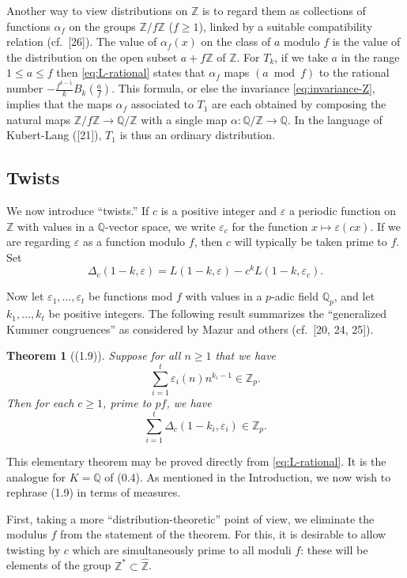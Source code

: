 \documentclass[12pt,a4paper]{article}
\theoremstyle{plain}
\newtheorem{theorem}{Theorem}[section]
\theoremstyle{definition}
\newcommand{\Z}{\mathbb{Z}}
\newcommand{\Q}{\mathbb{Q}}
\begin{document}
Another way to view distributions on $\Z$ is to regard them as collections of functions $\alpha_f$ on the groups $\Z/f\Z$ ($f\ge1$), linked by a suitable compatibility relation (cf.~[26]). The value of $\alpha_f(x)$ on the class of $a$ modulo $f$ is the value of the distribution on the open subset $a+f\Z$ of $\Z$. For $T_k$, if we take $a$ in the range $1\le a\le f$ then \eqref{eq:L-rational} states that $\alpha_f$ maps $(a\bmod f)$ to the rational number $-\frac{f^{k-1}}{k}B_k(\frac{a}{f})$. This formula, or else the invariance \eqref{eq:invariance-Z}, implies that the maps $\alpha_f$ associated to $T_1$ are each obtained by composing the natural maps $\Z/f\Z\to\Q/\Z$ with a single map $\alpha:\Q/\Z\to\Q$. In the language of Kubert-Lang ([21]), $T_1$ is thus an ordinary distribution.

\subsection*{Twists}

We now introduce ``twists.'' If $c$ is a positive integer and $\varepsilon$ a periodic function on $\Z$ with values in a $\Q$-vector space, we write $\varepsilon_c$ for the function $x\mapsto\varepsilon(cx)$. If we are regarding $\varepsilon$ as a function modulo $f$, then $c$ will typically be taken prime to $f$. Set
\begin{equation}\label{eq:twist}
\Delta_c(1-k,\varepsilon)=L(1-k,\varepsilon)-c^kL(1-k,\varepsilon_c).
\end{equation}

Now let $\varepsilon_1,\dots,\varepsilon_t$ be functions mod $f$ with values in a $p$-adic field $\Q_p$, and let $k_1,\dots,k_t$ be positive integers. The following result summarizes the ``generalized Kummer congruences'' as considered by Mazur and others (cf.~[20, 24, 25]).

\begin{theorem}[(1.9)]\label{thm:kummer}
Suppose for all $n\ge1$ that we have
\[
\sum_{i=1}^{t}\varepsilon_i(n)n^{k_i-1}\in\Z_p.
\]
Then for each $c\ge1$, prime to $pf$, we have
\[
\sum_{i=1}^{t}\Delta_c(1-k_i,\varepsilon_i)\in\Z_p.
\]
\end{theorem}

This elementary theorem may be proved directly from \eqref{eq:L-rational}. It is the analogue for $K=\Q$ of (0.4). As mentioned in the Introduction, we now wish to rephrase (1.9) in terms of measures.

First, taking a more ``distribution-theoretic'' point of view, we eliminate the modulus $f$ from the statement of the theorem. For this, it is desirable to allow twisting by $c$ which are simultaneously prime to all moduli $f$: these will be elements of the group $\Z^*\subset\hat{\Z}$.
\end{document}
